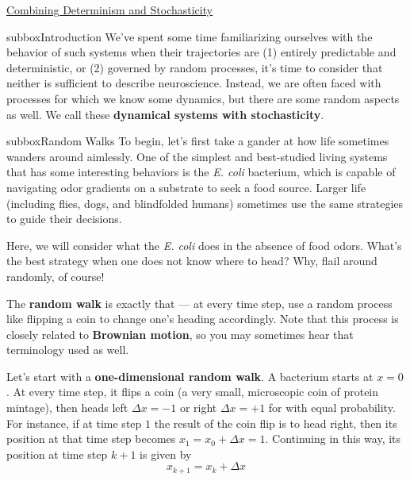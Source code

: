 \begin{textbox}{\href{https://compneuro.neuromatch.io/tutorials/W2D2_LinearSystems/student/W2D2_Tutorial3.html}{Combining Determinism and Stochasticity } }
\begin{subbox}{subbox}{Introduction}
\scriptsize
We've spent some time familiarizing ourselves with the behavior of such systems when their trajectories are (1) entirely predictable and deterministic, or (2) governed by random processes, it's time to consider that neither is sufficient to describe neuroscience. Instead, we are often faced with processes for which we know some dynamics, but there are some random aspects as well. We call these \textbf{dynamical systems with stochasticity}.

\end{subbox}
\begin{subbox}{subbox}{Random Walks}
\scriptsize
To begin, let's first take a gander at how life sometimes wanders around aimlessly. One of the simplest and best-studied living systems that has some interesting behaviors is the \textit{E. coli} bacterium, which is capable of navigating odor gradients on a substrate to seek a food source. Larger life (including flies, dogs, and blindfolded humans) sometimes use the same strategies to guide their decisions.

Here, we will consider what the \textit{E. coli} does in the absence of food odors. What's the best strategy when one does not know where to head? Why, flail around randomly, of course!

The \textbf{random walk} is exactly that --- at every time step, use a random process like flipping a coin to change one's heading accordingly. Note that this process is closely related to \textbf{Brownian motion}, so you may sometimes hear that terminology used as well.

Let's start with a \textbf{one-dimensional random walk}. A bacterium starts at $x=0$. At every time step, it flips a coin (a very small, microscopic coin of protein mintage), then heads left $\Delta x = -1$ or right $\Delta x = +1$ for with equal probability. For instance, if at time step $1$ the result of the coin flip is to head right, then its position at that time step becomes $x_1 = x_0 + \Delta x = 1.$ Continuing in this way, its position at time step $k+1$ is given by 
$$x_{k+1} = x_k + \Delta x $$    


\end{subbox}
\end{textbox}
